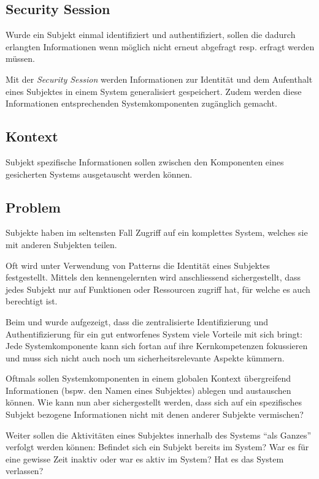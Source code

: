 \subsection{Security Session}
\label{sec:security-session}
Wurde ein Subjekt einmal identifiziert und authentifiziert, sollen die dadurch erlangten Informationen wenn möglich nicht erneut abgefragt resp. erfragt werden müssen.

Mit der \emph{Security Session} werden Informationen zur Identität und dem Aufenthalt eines Subjektes in einem System generalisiert gespeichert. Zudem werden diese Informationen entsprechenden Systemkomponenten zugänglich gemacht.

\subsection*{Kontext}
Subjekt spezifische Informationen sollen zwischen den Komponenten eines gesicherten Systems ausgetauscht werden können.

\subsection*{Problem}
Subjekte haben im seltensten Fall Zugriff auf ein komplettes System, welches sie mit anderen Subjekten teilen.

Oft wird unter Verwendung von \emph{} Patterns die Identität eines Subjektes festgestellt. Mittels den kennengelernten \emph{} wird anschliessend sichergestellt, dass jedes Subjekt nur auf Funktionen oder Ressourcen zugriff hat, für welche es auch berechtigt ist.

Beim \emph{} und \emph{} wurde aufgezeigt, dass die zentralisierte Identifizierung und Authentifizierung für ein gut entworfenes System viele Vorteile mit sich bringt: Jede Systemkomponente kann sich fortan auf ihre Kernkompetenzen fokussieren und muss sich nicht auch noch um sicherheitsrelevante Aspekte kümmern.

Oftmals sollen Systemkomponenten in einem globalen Kontext übergreifend Informationen (bspw. den Namen eines Subjektes) ablegen und austauschen können. Wie kann nun aber sichergestellt werden, dass sich auf ein spezifisches Subjekt bezogene Informationen nicht mit denen anderer Subjekte vermischen?

Weiter sollen die Aktivitäten eines Subjektes innerhalb des Systems ``als Ganzes'' verfolgt werden können: Befindet sich ein Subjekt bereits im System? War es für eine gewisse Zeit inaktiv oder war es aktiv im System? Hat es das System verlassen?


